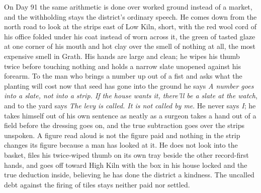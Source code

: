 \documentclass{design/chronicle}
\begin{document}
{On Day 91 the same arithmetic is done over worked ground instead of a market, and the withholding stays the district’s ordinary speech. He comes down from the north road to look at the strips east of Low Kiln, short, with the red wool cord of his office folded under his coat instead of worn across it, the green of tasted glaze at one corner of his mouth and hot clay over the smell of nothing at all, the most expensive smell in Grath. His hands are large and clean; he wipes his thumb twice before touching nothing and holds a narrow slate unopened against his forearm. To the man who brings a number up out of a fist and asks what the planting will cost now that seed has gone into the ground he says \emph{A number goes into a slate, not into a strip. If the house wants it, there’ll be a slate at the watch}, and to the yard says \emph{The levy is called. It is not called by me}. He never says \emph{I}; he takes himself out of his own sentence as neatly as a surgeon takes a hand out of a field before the dressing goes on, and the true subtraction goes over the strips unspoken. A figure read aloud is not the figure paid and nothing in the strip changes its figure because a man has looked at it. He does not look into the basket, files his twice-wiped thumb on its own tray beside the other record-first hands, and goes off toward High Kiln with the box in his house locked and the true deduction inside, believing he has done the district a kindness. The uncalled debt against the firing of tiles stays neither paid nor settled.

}
\end{document}
